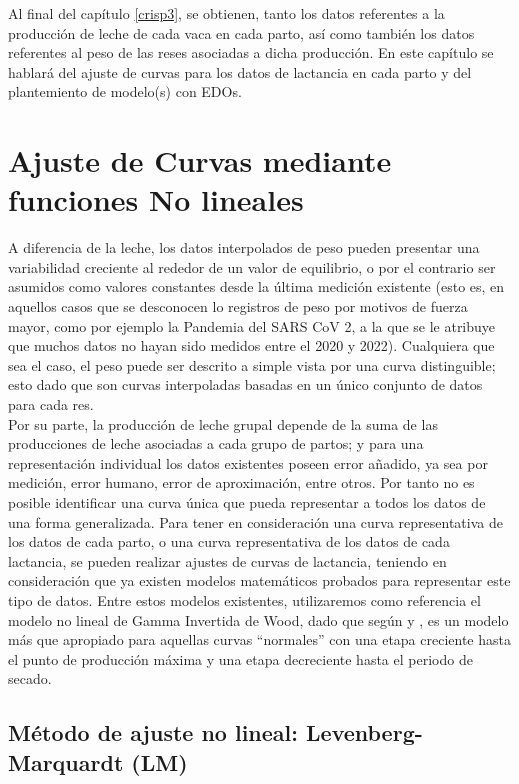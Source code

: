 Al final del capítulo \ref{crisp3}, se obtienen, tanto los datos referentes a la producción de leche de cada vaca en cada parto, así como también los datos referentes al peso de las reses asociadas a dicha producción. En este capítulo se hablará del ajuste de curvas para los datos de lactancia en cada parto y del plantemiento de modelo(s) con EDOs.

\section{Ajuste de Curvas mediante funciones No lineales}\label{ajustenonlin}

A diferencia de la leche, los datos interpolados de peso pueden presentar una variabilidad  creciente al rededor de un valor de equilibrio, o por el contrario ser asumidos como valores constantes desde la última medición existente (esto es, en aquellos casos que se desconocen lo registros de peso por motivos de fuerza mayor, como por ejemplo la Pandemia del SARS CoV 2, a la que se le atribuye que muchos datos no hayan sido medidos entre el 2020 y 2022). Cualquiera que sea el caso, el peso puede ser descrito a simple vista por una curva distinguible; esto dado que son curvas interpoladas basadas en un único conjunto de datos para cada res.\\

Por su parte, la producción de leche grupal depende de la suma de las producciones de leche asociadas a cada grupo de partos; y para una representación individual los datos existentes poseen error añadido, ya sea por medición, error humano, error de aproximación, entre otros. Por tanto no es posible identificar una curva única que pueda representar a todos los datos de una forma generalizada. Para tener en consideración una curva representativa de los datos de cada parto, o una curva representativa de los datos de cada lactancia, se pueden realizar ajustes de curvas de lactancia, teniendo en consideración que ya existen modelos matemáticos probados para representar este tipo de datos. Entre estos modelos existentes, utilizaremos como referencia el modelo no lineal de Gamma Invertida de Wood, dado que según \cite{silvestre} y \cite{shanks}, es un modelo más que apropiado para aquellas curvas ``normales'' con una etapa creciente hasta el punto de producción máxima y una etapa decreciente hasta el periodo de secado.\\
 
\subsection{Método de ajuste no lineal: Levenberg-Marquardt (LM)}

